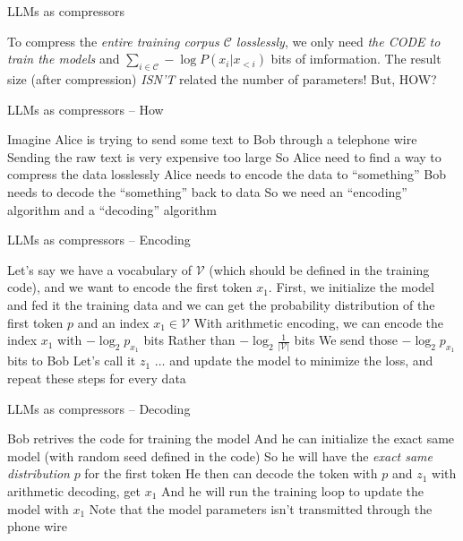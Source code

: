 \documentclass[scheme=plain]{ctexbeamer}
\begin{document}
\begin{frame}{LLMs as compressors}
  \begin{outline}
    \1 To compress the \emph{entire training corpus $\mathcal{C}$ losslessly}, we only need \emph{the CODE to train the models} and $\sum_{i \in \mathcal{C}} - \log P(x_i | x_{<i}) $ bits of imformation.
      \2 The result size (after compression) \emph{ISN'T} related the number of parameters!
      \pause
    \1 But, HOW?
  \end{outline}
\end{frame}

\begin{frame}{LLMs as compressors -- How}
  \begin{outline}
    \1 Imagine Alice is trying to send some text to Bob through a telephone wire
    \1 Sending the raw text is very expensive
      \2 too large
    \1 So Alice need to find a way to compress the data losslessly
    \1 Alice needs to encode the data to ``something''
    \1 Bob needs to decode the ``something'' back to data
    \1 So we need an ``encoding'' algorithm and a ``decoding'' algorithm
  \end{outline}
\end{frame}

\begin{frame}{LLMs as compressors -- Encoding}
  \begin{outline}
    \1 Let's say we have a vocabulary of \(\mathcal{V}\) (which should be defined in the training code), and we want to encode the first token \(x_1\).
    \pause
    \1 First, we initialize the model and fed it the training data
      \2 and we can get the probability distribution of the first token $p$ and an index $x_1 \in \mathcal{V}$
      \pause
    \1 With arithmetic encoding, we can encode the index $x_1$ with $-\log_2 p_{x_1}$ bits
      \2 Rather than $-\log_2 \frac{1}{|\mathcal{V}|}$ bits
      \pause
    \1 We send those $-\log_2 p_{x_1}$ bits to Bob
      \2 Let's call it $z_1$
      \pause
    \1 $\dots$ and update the model to minimize the loss, and repeat these steps for every data
  \end{outline}
\end{frame}

\begin{frame}{LLMs as compressors -- Decoding}
  \begin{outline}
    \1 Bob retrives the code for training the model
    \pause
    \1 And he can initialize the exact same model (with random seed defined in the code)
    \pause
    \1 So he will have the \emph{exact same distribution} $p$ for the first token
      \2 He then can decode the token with $p$ and $z_1$ with arithmetic decoding, get $x_1$
      \pause
    \1 And he will run the training loop to update the model with $x_1$
    \1 Note that the model parameters isn't transmitted through the phone wire
  \end{outline}
\end{frame}
\end{document}
